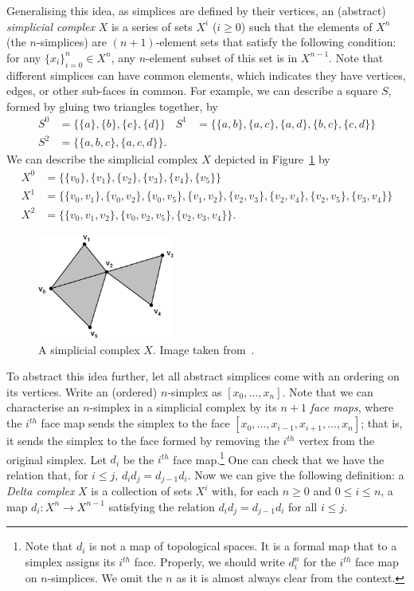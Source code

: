 \documentclass[a4paper,11pt,leqno]{article} \usepackage{amsmath}
\theoremstyle{definition} \newtheorem{defn}{Definition}
\begin{document}
Generalising this idea, as simplices are defined by their vertices, an
(abstract) \emph{simplicial complex} $X$ is a series of sets $X^i$ ($i\geq 0$)
such that the elements of $X^n$ (the $n$-simplices) are $(n+1)$-element sets
that satisfy the following condition: for any $\{x_i\}_{i=0}^n\in X^n$, any
$n$-element subset of this set is in $X^{n-1}$.  Note that different simplices
can have common elements, which indicates they have vertices, edges, or other
sub-faces in common.  For example, we can describe a square $S$, formed by
gluing two triangles together, by \begin{align*} S^0	&=
\{\{a\},\{b\},\{c\},\{d\}\} & S^1	&= \{\{a, b\}, \{a, c\}, \{a, d\}, \{b, c\},
\{c, d\}\}\\ S^2	&= \{\{a,b,c\}, \{a,c,d\}\}.  \end{align*} We can describe the
simplicial complex $X$ depicted in Figure~\ref{fig_simplicial_complex} by
\begin{align*} X^0	&= \{\{v_0\}, \{v_1\}, \{v_2\}, \{v_3\}, \{v_4\},
  \{v_5\}\}\\ X^1	&= \{\{v_0, v_1\}, \{v_0, v_2\}, \{v_0, v_5\}, \{v_1, v_2\},
  \{v_2, v_3\}, \{v_2, v_4\}, \{v_2, v_5\}, \{v_3, v_4\}\}\\ X^2	&= \{\{v_0,
v_1, v_2\}, \{v_0, v_2, v_5\}, \{v_2, v_3, v_4\}\}.  \end{align*}

\begin{figure} \centering
\includegraphics[width=0.4\textwidth]{figures/simp1.jpg} \caption{A simplicial
complex $X$. Image taken from~\cite{Friedman08}.} \label{fig_simplicial_complex}
\end{figure}

To abstract this idea further, let all abstract simplices come with an ordering
on its vertices.  Write an (ordered) $n$-simplex as $[x_0,\dots,x_n]$.  Note
that we can characterise an $n$-simplex in a simplicial complex by its $n+1$
\emph{face maps}, where the $i^{th}$ face map sends the simplex to the face
$[x_0,\dots, x_{i-1},x_{i+1},\dots, x_n]$; that is, it sends the simplex to the
face formed by removing the $i^{th}$ vertex from the original simplex.  Let
$d_i$ be the $i^{th}$ face map.\footnote{ Note that $d_i$ is not a map of
topological spaces. It is a formal map that to a simplex assigns its $i^{th}$
face.  Properly, we should write $d_i^n$ for the $i^{th}$ face map on
$n$-simplices. We omit the $n$ as it is almost always clear from the context.
} One can check that we have the relation that, for $i \leq j$, $d_id_j
= d_{j-1}d_i$.  Now we can give the following definition: a \emph{Delta complex}
$X$ is a collection of sets $X^i$ with, for each $n\geq 0$ and $0\leq i\leq n$,
a map $d_i: X^{n}\to X^{n-1}$ satisfying the relation $d_id_j = d_{j-1}d_i$ for
all $i\leq j$.
\end{document}
